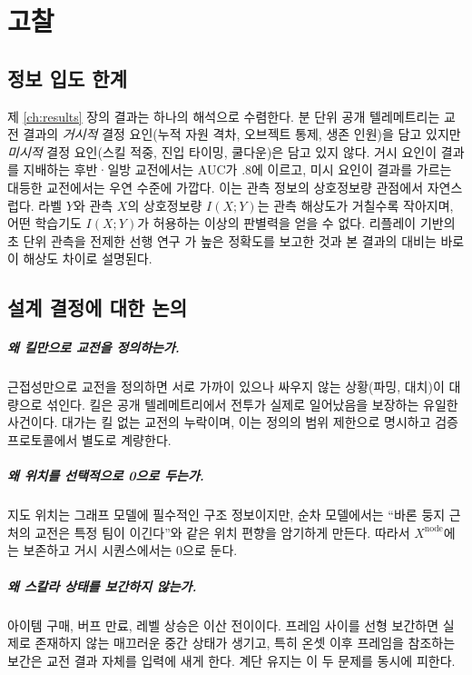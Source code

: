 \chapter{고찰}
\label{ch:discussion}

\section{정보 입도 한계}
\label{sec:disc-granularity}

제 \ref{ch:results} 장의 결과는 하나의 해석으로 수렴한다. 분 단위 공개 텔레메트리는 교전 결과의 \emph{거시적} 결정 요인(누적 자원 격차, 오브젝트 통제, 생존 인원)을 담고 있지만 \emph{미시적} 결정 요인(스킬 적중, 진입 타이밍, 쿨다운)은 담고 있지 않다. 거시 요인이 결과를 지배하는 후반·일방 교전에서는 AUC가 $.8$에 이르고, 미시 요인이 결과를 가르는 대등한 교전에서는 우연 수준에 가깝다. 이는 관측 정보의 상호정보량 관점에서 자연스럽다. 라벨 $Y$와 관측 $X$의 상호정보량 $I(X;Y)$는 관측 해상도가 거칠수록 작아지며, 어떤 학습기도 $I(X;Y)$가 허용하는 이상의 판별력을 얻을 수 없다. 리플레이 기반의 초 단위 관측을 전제한 선행 연구 \cite{katona2019time}가 높은 정확도를 보고한 것과 본 결과의 대비는 바로 이 해상도 차이로 설명된다.

\section{설계 결정에 대한 논의}
\label{sec:disc-design}

\paragraph{왜 킬만으로 교전을 정의하는가.} 근접성만으로 교전을 정의하면 서로 가까이 있으나 싸우지 않는 상황(파밍, 대치)이 대량으로 섞인다. 킬은 공개 텔레메트리에서 전투가 실제로 일어났음을 보장하는 유일한 사건이다. 대가는 킬 없는 교전의 누락이며, 이는 정의의 범위 제한으로 명시하고 검증 프로토콜에서 별도로 계량한다.

\paragraph{왜 위치를 선택적으로 0으로 두는가.} 지도 위치는 그래프 모델에 필수적인 구조 정보이지만, 순차 모델에서는 ``바론 둥지 근처의 교전은 특정 팀이 이긴다''와 같은 위치 편향을 암기하게 만든다. 따라서 $X^{\mathrm{node}}$에는 보존하고 거시 시퀀스에서는 0으로 둔다.

\paragraph{왜 스칼라 상태를 보간하지 않는가.} 아이템 구매, 버프 만료, 레벨 상승은 이산 전이이다. 프레임 사이를 선형 보간하면 실제로 존재하지 않는 매끄러운 중간 상태가 생기고, 특히 온셋 이후 프레임을 참조하는 보간은 교전 결과 자체를 입력에 새게 한다. 계단 유지는 이 두 문제를 동시에 피한다.


